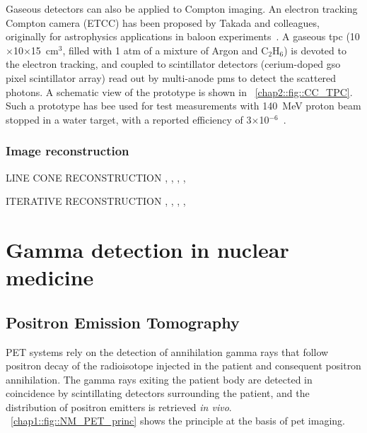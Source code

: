 Gaseous detectors can also be applied to Compton imaging. An electron tracking Compton camera (ETCC) has been proposed by Takada and colleagues, originally for astrophysics applications in baloon experiments~\parencite{Takada2011}. A gaseous \gls{tpc} (10$\times$10$\times$15~cm$^3$, filled with 1 atm of a mixture of Argon and C$_2$H$_6$) is devoted to the electron tracking, and coupled to scintillator detectors (cerium-doped \gls{gso} pixel scintillator array) read out by multi-anode \glspl{pm} to detect the scattered photons. A schematic view of the prototype is shown in \figurename~\ref{chap2::fig::CC_TPC}. Such a prototype has bee used for test measurements with 140~MeV proton beam stopped in a water target, with a reported efficiency of 3$\times$10$^{-6}$~\parencite{Kurosawa2012}. 


\subsubsection{Image reconstruction}\label{chap2::subsubsec::PGI_reconstruction}
LINE CONE RECONSTRUCTION \parencite{Cree1994}, \parencite{Basko1998}, \parencite{Parra1999}, \parencite{Hirasawa2003}, \parencite{Maxim2009} 

ITERATIVE RECONSTRUCTION \parencite{Schone2010}, \parencite{Zoglauer2011}, \parencite{Gillam2011}, \parencite{Lojacono2013}, \parencite{Mackin2012}


\section{Gamma detection in nuclear medicine}\label{chap2::sec::GammaNM}

\subsection{Positron Emission Tomography}\label{chap1::subsec::PET_NM}

PET systems rely on the detection of annihilation gamma rays that follow positron decay of the radioisotope injected in the patient and consequent positron annihilation. The gamma rays exiting the patient body are detected in coincidence by scintillating detectors surrounding the patient, and the distribution of positron emitters is retrieved \textit{in vivo}. 
\figurename~\ref{chap1::fig::NM_PET_princ} shows the principle at the basis of \gls{pet} imaging. 

